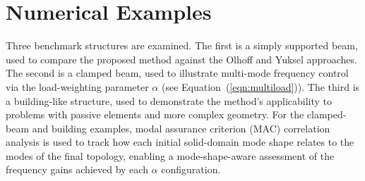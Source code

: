 \documentclass[applsci,article,submit,pdftex,moreauthors]{Definitions/mdpi}
\begin{document}
\section{Numerical Examples}

Three benchmark structures are examined. The first is a simply supported beam, used to compare the proposed method against the Olhoff and Yuksel approaches. The second is a clamped beam, used to illustrate multi-mode frequency control via the load-weighting parameter $\alpha$ (see Equation~(\ref{eqn:multiload})). The third is a building-like structure, used to demonstrate the method's applicability to problems with passive elements and more complex geometry. For the clamped-beam and building examples, modal assurance criterion (MAC) correlation analysis is used to track how each initial solid-domain mode shape relates to the modes of the final topology, enabling a mode-shape-aware assessment of the frequency gains achieved by each $\alpha$ configuration.
\end{document}
